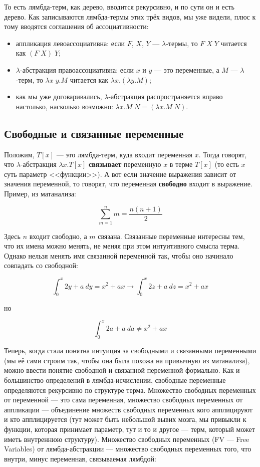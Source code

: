 \documentclass[a5paper]{article}
\begin{document}
То есть лямбда-терм, как дерево, вводится рекурсивно, и по сути он и есть дерево. Как записываются лямбда-термы этих трёх видов, мы уже видели, плюс к тому вводятся соглашения об ассоциативности:

\begin{itemize}
    \item аппликация левоассоциативна: если $F$, $X$, $Y$ --- $\lambda$-термы, то $F \; X \; Y$ читается как $(F \; X) \; Y$;
    \item $\lambda$-абстракция правоассоциативна: если $x$ и $y$ --- это переменные, а $M$ --- $\lambda$-терм, то $\lambda x \; y.M$ читается как $\lambda x.(\lambda y.M)$;
    \item как мы уже договаривались, $\lambda$-абстракция распространяется вправо настолько, насколько возможно: $\lambda x.M \; N = (\lambda x.M \; N)$.
\end{itemize}

\subsection{Свободные и связанные переменные}

Положим, $T[x]$ --- это лямбда-терм, куда входит переменная $x$. Тогда говорят, что $\lambda$-абстракция $\lambda x.T[x]$ \textbf{связывает} переменную $x$ в терме $T[x]$ (то есть $x$ суть параметр <<функции>>). А вот если значение выражения зависит от значения переменной, то говорят, что переменная \textbf{свободно} входит в выражение. Пример, из матанализа:

$$\sum_{m = 1}^{n} m = \frac{n(n + 1)}{2}$$

Здесь $n$ входит свободно, а $m$ связана. Связанные переменные интересны тем, что их имена можно менять, не меняя при этом интуитивного смысла терма. Однако нельзя менять имя связанной переменной так, чтобы оно начинало совпадать со свободной:

$$\int_{0}^{x}2y + a\ dy = x^2 + ax \longrightarrow \int_{0}^{x}2z + a\ dz = x^2 + ax$$

но

$$\int_{0}^{x}2a + a\ da \neq x^2 + ax$$

Теперь, когда стала понятна интуиция за свободными и связанными переменными (мы её сами строим так, чтобы она была похожа на привычную из матанализа), можно ввести понятие свободной и связанной переменной формально. Как и большинство определений в лямбда-исчислении, свободные переменные определяются рекурсивно по структуре терма. Множество свободных переменных от переменной --- это сама переменная, множество свободных переменных от аппликации --- объединение множеств свободных переменных кого апплицируют и кто апплицируется (тут может быть небольшой вывих мозга, мы привыкли к функции, которая принимает параметр, тут и то и другое --- терм, который может иметь внутреннюю структуру). Множество свободных переменных (FV --- Free Variables) от лямбда-абстракции --- множество свободных переменных того, что внутри, минус переменная, связываемая лямбдой:
\end{document}
